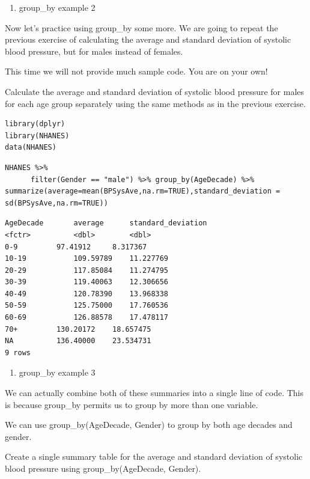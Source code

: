 \documentclass[
]{article}
\providecommand{\tightlist}{%
  \setlength{\itemsep}{0pt}\setlength{\parskip}{0pt}}
\begin{document}
\begin{enumerate}
\def\labelenumi{\arabic{enumi}.}
\setcounter{enumi}{5}
\tightlist
\item
  group\_by example 2
\end{enumerate}

Now let's practice using group\_by some more. We are going to repeat the
previous exercise of calculating the average and standard deviation of
systolic blood pressure, but for males instead of females.

This time we will not provide much sample code. You are on your own!

Calculate the average and standard deviation of systolic blood pressure
for males for each age group separately using the same methods as in the
previous exercise.

\begin{verbatim}
library(dplyr)
library(NHANES)
data(NHANES)
\end{verbatim}

\begin{verbatim}
NHANES %>%
      filter(Gender == "male") %>% group_by(AgeDecade) %>% summarize(average=mean(BPSysAve,na.rm=TRUE),standard_deviation = sd(BPSysAve,na.rm=TRUE))
\end{verbatim}

\begin{verbatim}
AgeDecade       average      standard_deviation
<fctr>          <dbl>        <dbl>
0-9         97.41912     8.317367
10-19           109.59789    11.227769
20-29           117.85084    11.274795
30-39           119.40063    12.306656
40-49           120.78390    13.968338
50-59           125.75000    17.760536
60-69           126.88578    17.478117
70+         130.20172    18.657475
NA          136.40000    23.534731
9 rows
\end{verbatim}

\begin{enumerate}
\def\labelenumi{\arabic{enumi}.}
\setcounter{enumi}{6}
\tightlist
\item
  group\_by example 3
\end{enumerate}

We can actually combine both of these summaries into a single line of
code. This is because group\_by permits us to group by more than one
variable.

We can use group\_by(AgeDecade, Gender) to group by both age decades and
gender.

Create a single summary table for the average and standard deviation of
systolic blood pressure using group\_by(AgeDecade, Gender).
\end{document}
